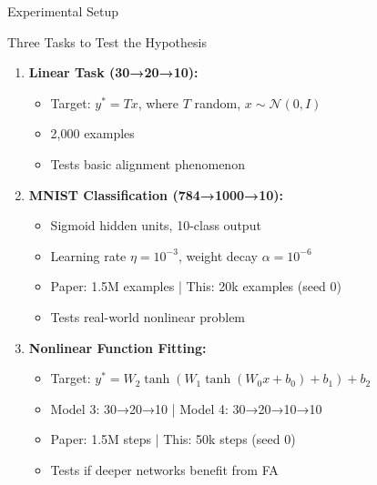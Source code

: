 \documentclass[aspectratio=169,10pt]{beamer}
\begin{document}
\begin{frame}{Experimental Setup}
  \begin{block}{Three Tasks to Test the Hypothesis}
  \end{block}

  \begin{enumerate}
    \item \textbf{Linear Task (30→20→10):}
    \begin{itemize}
      \item Target: $y^* = Tx$, where $T$ random, $x \sim \mathcal{N}(0,I)$
      \item 2,000 examples
      \item Tests basic alignment phenomenon
    \end{itemize}

    \vspace{0.2cm}
    \item \textbf{MNIST Classification (784→1000→10):}
    \begin{itemize}
      \item Sigmoid hidden units, 10-class output
      \item Learning rate $\eta = 10^{-3}$, weight decay $\alpha = 10^{-6}$
      \item Paper: 1.5M examples | \alert{This: 20k examples (seed 0)}
      \item Tests real-world nonlinear problem
    \end{itemize}

    \vspace{0.2cm}
    \item \textbf{Nonlinear Function Fitting:}
    \begin{itemize}
      \item Target: $y^* = W_2 \tanh(W_1 \tanh(W_0 x + b_0) + b_1) + b_2$
      \item Model 3: 30→20→10 | Model 4: 30→20→10→10
      \item Paper: 1.5M steps | \alert{This: 50k steps (seed 0)}
      \item Tests if deeper networks benefit from FA
    \end{itemize}
  \end{enumerate}
\end{frame}
\end{document}
